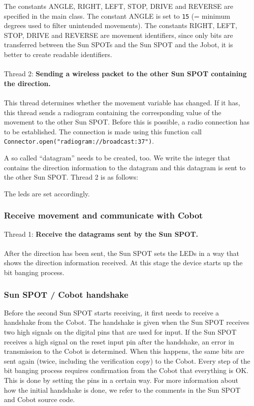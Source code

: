 \documentclass[a4paper,10pt]{article} %
\begin{document}
\noindent The constants ANGLE, RIGHT, LEFT, STOP, DRIVE and REVERSE are
specified in the main class. The constant ANGLE is set to \texttt{15} (= minimum
degrees used to filter unintended movements). The constants RIGHT, LEFT, STOP,
DRIVE and REVERSE are movement identifiers, since only bits are transferred
between the Sun SPOTs and the Sun SPOT and the Jobot, it is better to create
readable identifiers.
\\
\\
\noindent Thread 2: \textbf{Sending a wireless packet to the other Sun SPOT
containing the direction.}
\\
\\
This thread determines whether the movement variable has changed. If it has,
this thread sends a radiogram containing the corresponding value of the movement
to the other Sun SPOT. Before this is possible, a radio connection has to be
established. The connection is made using this function call
\texttt{Connector.open("radiogram://broadcast:37")}.

A so called ``datagram'' needs to be created, too. We write the integer that
contains the direction information to the datagram and this datagram is sent to
the other Sun SPOT. Thread 2 is as follows:



\noindent The leds are set accordingly.


\subsubsection{Receive movement and communicate with Cobot} %

\noindent Thread 1: \textbf{Receive the datagrams sent by the Sun SPOT.}
\\
\\
After the direction has been sent, the Sun SPOT sets the LEDs in a way that
shows the direction information received. At this stage the device starts up the
bit banging process.


\subsubsection{Sun SPOT / Cobot handshake} %
\label{ssub:Sun SPOT / Cobot handshake}

Before the second Sun SPOT starts receiving, it first needs to receive a
handshake from the Cobot. The handshake is given when the Sun SPOT receives two
high signals on the digital pins that are used for input. If the Sun SPOT
receives a high signal on the reset input pin after the handshake, an error in
transmission to the Cobot is determined. When this happens, the same bits are
sent again (twice, including the verification copy) to the Cobot. Every step of
the bit banging process requires confirmation from the Cobot that everything is
OK. This is done by setting the pins in a certain way. For more information
about how the initial handshake is done, we refer to the comments in the Sun
SPOT and Cobot source code.
\end{document}
